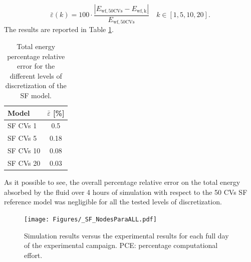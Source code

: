 \documentclass[final,3p,times,review]{elsarticle}
\providecommand{\DIFadd}[1]{{\protect\color{blue}\uwave{#1}}} %
\providecommand{\DIFaddbegin}{} %
\providecommand{\DIFaddend}{} %
\begin{document}
%
\begin{equation}
\bar{\varepsilon}(k) = 100 \cdot \frac{|E_\mathrm{wf,50CVs} -E_\mathrm{wf,k}|}{E_\mathrm{wf,50CVs}}  \quad k \in [1,5,10,20]. 
\end{equation}
%
The results are reported in Table \ref{tab:SF_Etot}.
%
\begin{table}[h!]
  \centering
  \caption{Total energy percentage relative error for the different levels of discretization of the SF model.}
    \begin{tabular}{lc}
    \toprule
    Model & \multicolumn{1}{c}{$\bar{\varepsilon}$ [\%]}  \\
    \midrule
    SF CVs 1      & 0.5         \\
    SF CVs 5      & 0.18         \\
    SF CVs 10     & 0.08          \\
    SF CVs 20     & 0.03          \\   
    \bottomrule
    \end{tabular}%
  \label{tab:SF_Etot}%
\end{table}%
%
As it \DIFaddbegin \DIFadd{is }\DIFaddend possible to see, the overall percentage relative error on the total energy absorbed by the fluid over 4 hours of simulation with respect to the 50 CVs SF reference model was negligible for all the tested levels of discretization.\\

\begin{landscape}
\begin{figure}[h!]
\centering
\texttt{[image: Figures/\_SF\_NodesParaALL.pdf]}
\caption{Simulation results versus the experimental results for each full day of the experimental campaign. PCE: percentage computational effort.}
\label{fig:SF_ModRes_ParAnalysis}
\end{figure}
\end{landscape}
%
%
%

%


%
\end{document}
